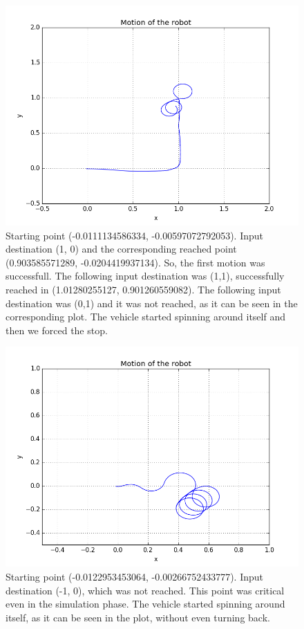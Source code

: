 \documentclass[a4paper,11pt,oneside]{book}
\begin{document}
\begin{figure}[H]
\begin{center}
\includegraphics[width=1\textwidth]{figs/experiments/1_1}
\caption[Experiment: Destinations (1, 0), (1, 1), (0, 1)]{Starting point (-0.0111134586334, -0.00597072792053). Input destination (1, 0) and the corresponding reached point (0.903585571289, -0.0204419937134). So, the first motion was successfull. The following input destination was  (1,1), successfully reached in (1.01280255127, 0.901260559082). The following input destination was (0,1) and it was not reached, as it can be seen in the corresponding plot. The vehicle started spinning around itself and then we forced the stop.}
\end{center}
\end{figure}

\begin{figure}[H]
\begin{center}
\includegraphics[width=1\textwidth]{figs/experiments/2_1}
\caption[Experiment: Destination (-1, 0)]{Starting point (-0.0122953453064, -0.00266752433777). Input destination (-1, 0), which was not reached. This point was critical even in the simulation phase. The vehicle started spinning around itself, as it can be seen in the plot, without even turning back.}
\end{center}
\end{figure}
\end{document}
